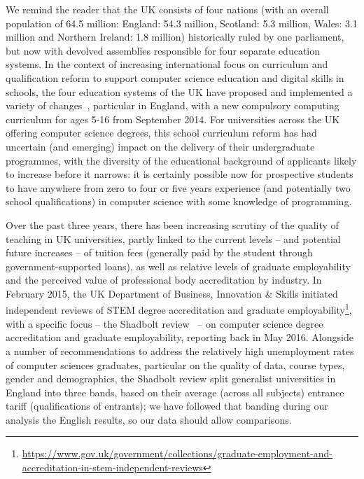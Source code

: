 \documentclass{sig-alternate}
\begin{document}
We remind the reader that the UK consists of four nations (with an
overall population of 64.5 million: England: 54.3 million, Scotland:
5.3 million, Wales: 3.1 million and Northern Ireland: 1.8 million)
historically ruled by one parliament, but now with devolved assemblies
responsible for four separate education systems. In the context of
increasing international focus on curriculum and qualification reform
to support computer science education and digital skills in schools,
the four education systems of the UK have proposed and implemented a
variety of changes~\cite{rs:2012,brown-et-al-toce2014}, particular in
England, with a new compulsory computing curriculum for ages 5-16 from
September 2014. For universities across the UK offering computer
science degrees, this school curriculum reform has had uncertain (and
emerging) impact on the delivery of their undergraduate programmes,
with the diversity of the educational background of applicants likely
to increase before it narrows: it is certainly possible now for
prospective students to have anywhere from zero to four or five years
experience (and potentially two school qualifications) in computer
science with some knowledge of programming.


Over the past three years, there has been increasing scrutiny of the
quality of teaching in UK universities, partly linked to the current
levels -- and potential future increases -- of tuition fees (generally
paid by the student through government-supported loans), as well as
relative levels of graduate employability and the perceived value of
professional body accreditation by industry. In February 2015, the UK
Department of Business, Innovation \& Skills initiated independent
reviews of STEM degree accreditation and graduate
employability\footnote{\url{https://www.gov.uk/government/collections/graduate-employment-and-accreditation-in-stem-independent-reviews}},
with a specific focus -- the Shadbolt review~\cite{shadbolt:2016} --
on computer science degree accreditation and graduate employability,
reporting back in May 2016. Alongside a number of recommendations to
address the relatively high unemployment rates of computer sciences
graduates, particular on the quality of data, course types, gender and
demographics, the Shadbolt review split generalist universities in
England into three bands, based on their average (across all subjects)
entrance tariff (qualifications of entrants); we have followed that
banding during our analysis the English results, so our data should
allow comparisons.
\end{document}
